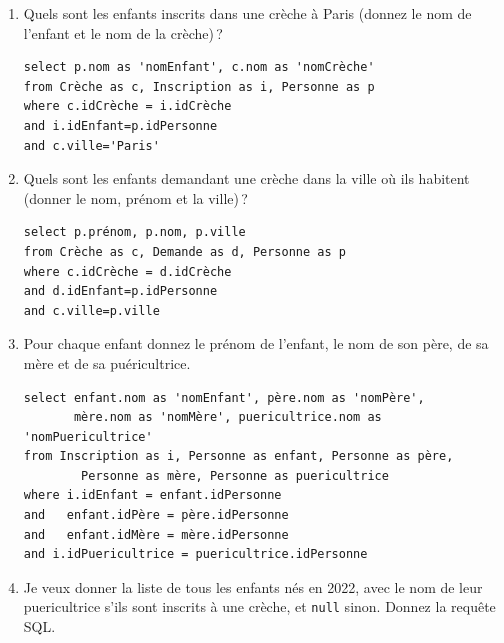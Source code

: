 \begin{enumerate}
  
  \item Quels sont les enfants inscrits dans une crèche à Paris (donnez le nom de l'enfant
      et le nom de la crèche)\,?

\begin{solution}
\begin{small}
\begin{verbatim}
select p.nom as 'nomEnfant', c.nom as 'nomCrèche'
from Crèche as c, Inscription as i, Personne as p
where c.idCrèche = i.idCrèche
and i.idEnfant=p.idPersonne
and c.ville='Paris'
\end{verbatim}
\end{small}
\end{solution}
  \item Quels sont les enfants demandant une crèche dans la ville où ils habitent
  (donner le nom, prénom et la ville)\,?
  
\begin{solution}
\begin{small}
\begin{verbatim}
select p.prénom, p.nom, p.ville
from Crèche as c, Demande as d, Personne as p
where c.idCrèche = d.idCrèche
and d.idEnfant=p.idPersonne
and c.ville=p.ville
\end{verbatim}
\end{small}
\end{solution}

  \item Pour chaque enfant donnez le prénom de l'enfant, le nom de son père, de sa mère
  et de sa puéricultrice.

\begin{solution}
\begin{small}
\begin{verbatim}
select enfant.nom as 'nomEnfant', père.nom as 'nomPère',
       mère.nom as 'nomMère', puericultrice.nom as 'nomPuericultrice'
from Inscription as i, Personne as enfant, Personne as père, 
        Personne as mère, Personne as puericultrice
where i.idEnfant = enfant.idPersonne
and   enfant.idPère = père.idPersonne
and   enfant.idMère = mère.idPersonne
and i.idPuericultrice = puericultrice.idPersonne
\end{verbatim}
\end{small}
\end{solution}

 \item Je veux donner la liste de tous les enfants nés en 2022, avec le nom
     de leur puericultrice s'ils sont inscrits à une crèche, et \texttt{null}
     sinon. Donnez la requête SQL.
     

\end{enumerate}
